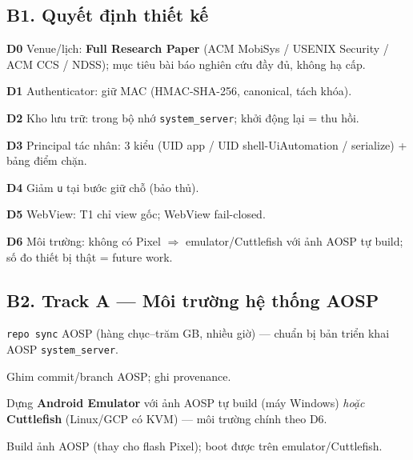 \documentclass[11pt,a4paper]{article}
\newcommand{\done}{\textcolor{shgreen}{$\blacksquare$}}
\newcommand{\todo}{\textcolor{shgray}{$\square$}}
\newcommand{\code}[1]{\texttt{\small #1}}
\begin{document}
\subsection*{B1. Quyết định thiết kế}
\begin{chk}
\item[\done] \textbf{D0} Venue/lịch: \textbf{Full Research Paper} (ACM MobiSys / USENIX Security / ACM CCS / NDSS); mục tiêu bài báo nghiên cứu đầy đủ, không hạ cấp.
\item[\done] \textbf{D1} Authenticator: giữ MAC (HMAC-SHA-256, canonical, tách khóa).
\item[\done] \textbf{D2} Kho lưu trữ: trong bộ nhớ \code{system\_server}; khởi động lại = thu hồi.
\item[\done] \textbf{D3} Principal tác nhân: 3 kiểu (UID app / UID shell-UiAutomation / serialize) + bảng điểm chặn.
\item[\done] \textbf{D4} Giảm \code{u} tại bước giữ chỗ (bảo thủ).
\item[\done] \textbf{D5} WebView: T1 chỉ view gốc; WebView fail-closed.
\item[\done] \textbf{D6} Môi trường: không có Pixel $\Rightarrow$ emulator/Cuttlefish với ảnh AOSP tự build; số đo thiết bị thật = future work.
\end{chk}

\subsection*{B2. Track A --- Môi trường hệ thống AOSP}
\begin{chk}
\item[\todo] \code{repo sync} AOSP (hàng chục--trăm GB, nhiều giờ) --- chuẩn bị bản triển khai AOSP \code{system\_server}.
\item[\todo] Ghim commit/branch AOSP; ghi provenance.
\item[\todo] Dựng \textbf{Android Emulator} với ảnh AOSP tự build (máy Windows) \emph{hoặc} \textbf{Cuttlefish} (Linux/GCP có KVM) --- môi trường chính theo D6.
\item[\todo] Build ảnh AOSP (thay cho flash Pixel); boot được trên emulator/Cuttlefish.
\end{chk}
\end{document}
